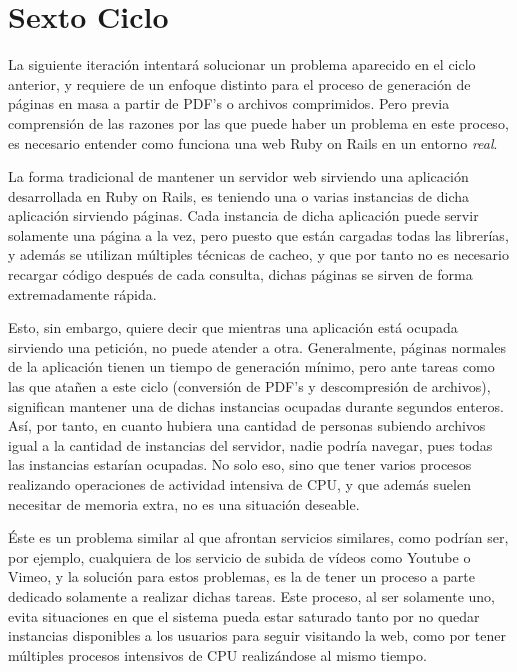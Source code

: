 \section{Sexto Ciclo} %
\label{sec:sexto_ciclo}

La siguiente iteración intentará solucionar un problema aparecido en el ciclo anterior, y requiere de un enfoque distinto para el proceso de generación de páginas en masa a partir de PDF's o archivos comprimidos. Pero previa comprensión de las razones por las que puede haber un problema en este proceso, es necesario entender como funciona una web Ruby on Rails en un entorno \emph{real}.

La forma tradicional de mantener un servidor web sirviendo una aplicación desarrollada en Ruby on Rails, es teniendo una o varias instancias de dicha aplicación sirviendo páginas. Cada instancia de dicha aplicación puede servir solamente una página a la vez, pero puesto que están cargadas todas las librerías, y además se utilizan múltiples técnicas de cacheo, y que por tanto no es necesario recargar código después de cada consulta, dichas páginas se sirven de forma extremadamente rápida.

Esto, sin embargo, quiere decir que mientras una aplicación está ocupada sirviendo una petición, no puede atender a otra. Generalmente, páginas normales de la aplicación tienen un tiempo de generación mínimo, pero ante tareas como las que atañen a este ciclo (conversión de PDF's y descompresión de archivos), significan mantener una de dichas instancias ocupadas durante segundos enteros. Así, por tanto, en cuanto hubiera una cantidad de personas subiendo archivos igual a la cantidad de instancias del servidor, nadie podría navegar, pues todas las instancias estarían ocupadas. No solo eso, sino que tener varios procesos realizando operaciones de actividad intensiva de CPU, y que además suelen necesitar de memoria extra, no es una situación deseable.

Éste es un problema similar al que afrontan servicios similares, como podrían ser, por ejemplo, cualquiera de los servicio de subida de vídeos como Youtube o Vimeo, y la solución para estos problemas, es la de tener un proceso a parte dedicado solamente a realizar dichas tareas. Este proceso, al ser solamente uno, evita situaciones en que el sistema pueda estar saturado tanto por no quedar instancias disponibles a los usuarios para seguir visitando la web, como por tener múltiples procesos intensivos de CPU realizándose al mismo tiempo.

